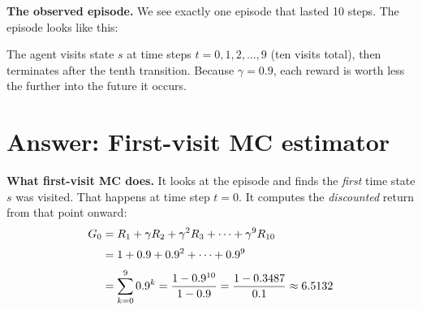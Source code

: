 \documentclass[11pt]{article}
\begin{document}
\textbf{The observed episode.} We see exactly one episode that lasted 10 steps. The episode looks like this:

\begin{center}
\end{center}

The agent visits state $s$ at time steps $t = 0, 1, 2, \ldots, 9$ (ten visits total), then terminates after the tenth transition. Because $\gamma = 0.9$, each reward is worth less the further into the future it occurs.

\section*{Answer: First-visit MC estimator}

\textbf{What first-visit MC does.} It looks at the episode and finds the \textit{first} time state $s$ was visited. That happens at time step $t = 0$. It computes the \textit{discounted} return from that point onward:
\begin{align}
    G_0 &= R_1 + \gamma R_2 + \gamma^2 R_3 + \cdots + \gamma^9 R_{10} \notag \\[2pt]
    &= 1 + 0.9 + 0.9^2 + \cdots + 0.9^9 \notag \\[2pt]
    &= \sum_{k=0}^{9} 0.9^k = \frac{1 - 0.9^{10}}{1 - 0.9} = \frac{1 - 0.3487}{0.1} \approx 6.5132
\end{align}
\end{document}
